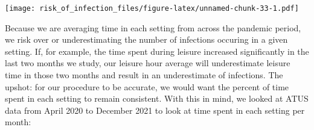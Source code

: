 \documentclass[
]{article}
\begin{document}
\texttt{[image: risk\_of\_infection\_files/figure-latex/unnamed-chunk-33-1.pdf]}

Because we are averaging time in each setting from across the pandemic
period, we risk over or underestimating the number of infections
occuring in a given setting. If, for example, the time spent during
leisure increased significantly in the last two months we study, our
leisure hour average will underestimate leisure time in those two months
and result in an underestimate of infections. The upshot: for our
procedure to be accurate, we would want the percent of time spent in
each setting to remain consistent. With this in mind, we looked at ATUS
data from April 2020 to December 2021 to look at time spent in each
setting per month:
\end{document}
